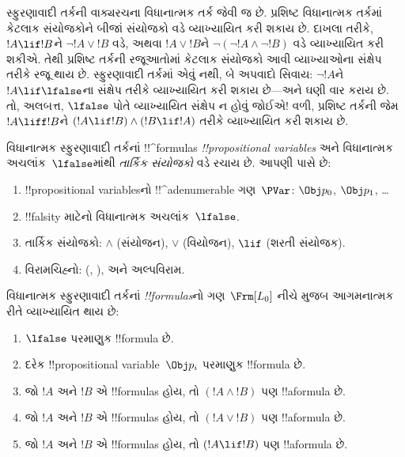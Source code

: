 \documentclass[../../../include/open-logic-section]{subfiles}
\begin{document}


સ્ફુરણાવાદી તર્કની વાક્યરચના વિધાનાત્મક તર્ક જેવી જ છે.
પ્રશિષ્ટ વિધાનાત્મક તર્કમાં કેટલાક સંયોજકોને બીજાં સંયોજકો
વડે વ્યાખ્યાયિત કરી શકાય છે. દાખલા તરીકે, $!A \lif !B$ને
$\lnot !A \lor !B$ વડે, અથવા $!A \lor !B$ને
$\lnot(\lnot !A \land \lnot !B)$ વડે વ્યાખ્યાયિત કરી શકીએ.
તેથી પ્રશિષ્ટ તર્કની રજૂઆતોમાં કેટલાક સંયોજકો આવી વ્યાખ્યાઓના
સંક્ષેપ તરીકે રજૂ થાય છે. સ્ફુરણાવાદી તર્કમાં એવું નથી, બે
અપવાદો સિવાય: $\lnot !A$ને $!A \lif \lfalse$ના સંક્ષેપ
તરીકે વ્યાખ્યાયિત કરી શકાય છે---અને ઘણી વાર કરાય છે. તો,
અલબત્ત, $\lfalse$ પોતે વ્યાખ્યાયિત સંક્ષેપ ન હોવું જોઈએ!{}
વળી, પ્રશિષ્ટ તર્કની જેમ $!A \liff !B$ને
$(!A \lif !B) \land (!B \lif !A)$ તરીકે વ્યાખ્યાયિત કરી
શકાય છે.

વિધાનાત્મક સ્ફુરણાવાદી તર્કનાં !!^{formula}s
\emph{!!{propositional variable}s} અને વિધાનાત્મક
અચલાંક~$\lfalse$માંથી \emph{તાર્કિક સંયોજકો} વડે રચાય છે.
આપણી પાસે છે:

\begin{enumerate}
\item !!{propositional variable}sનો !!^a{denumerable} ગણ~$\PVar$:
  $\Obj p_0$,
  $\Obj p_1$, \dots
  \item !!{falsity} માટેનો વિધાનાત્મક અચલાંક~$\lfalse$.
\item તાર્કિક સંયોજકો: $\land$ (સંયોજન), $\lor$ (વિયોજન),
  $\lif$ (શરતી સંયોજક).
\item વિરામચિહ્નો: (, ), અને અલ્પવિરામ.
\end{enumerate}

\begin{defn}[સૂત્ર]
 વિધાનાત્મક સ્ફુરણાવાદી તર્કનાં
\emph{!!{formula}s}નો ગણ~$\Frm[L_0]$ નીચે મુજબ આગમનાત્મક
રીતે વ્યાખ્યાયિત થાય છે:
\begin{enumerate}
\item $\lfalse$ પરમાણુક !!{formula} છે.

\item દરેક !!{propositional variable}~$\Obj p_i$ પરમાણુક
  !!{formula} છે.

\item જો $!A$ અને $!B$ એ !!{formula}s હોય, તો $(!A \land
  !B)$ પણ !!a{formula} છે.

\item જો $!A$ અને $!B$ એ !!{formula}s હોય, તો $(!A \lor !B)$
  પણ !!a{formula} છે.

\item જો $!A$ અને $!B$ એ !!{formula}s હોય, તો $(!A \lif !B)$
  પણ !!a{formula} છે.

\end{enumerate}
\end{defn}
\end{document}
